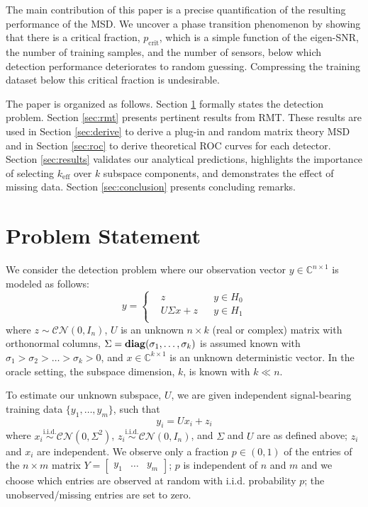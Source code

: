 The main contribution of this paper is a precise quantification of the resulting performance of the MSD. We uncover a phase transition phenomenon by showing that there is a critical fraction, $p_\text{crit}$, which is a simple function of the eigen-SNR, the number of training samples, and the number of sensors, below which detection performance deteriorates to random guessing. Compressing the training dataset below this critical fraction is undesirable.

The paper is organized as follows. Section \ref{sec:prob stat} formally states the detection problem. Section \ref{sec:rmt} presents pertinent results from RMT. These results are used in Section \ref{sec:derive} to derive a plug-in and random matrix theory MSD and in Section \ref{sec:roc} to derive theoretical ROC curves for each detector. Section \ref{sec:results} validates our analytical predictions, highlights the importance of selecting $k_\text{eff}$ over $k$ subspace components, and demonstrates the effect of missing data. Section \ref{sec:conclusion} presents concluding remarks.

\section{Problem Statement}\label{sec:prob stat}

We consider the detection problem where our observation vector $y \in \mathbb{C}^{n \times 1}$ is modeled as follows:
\begin{equation}\label{eq:problem}
y=\left\{
\begin{aligned}
&z
&& y\in H_0\\
&U\Sigma x+z
&& y\in H_1\\
\end{aligned}\right.
\end{equation}
where $z\sim\mathcal{CN}(0,I_n)$, $U$ is an unknown $n\times k$ (real or complex) matrix with orthonormal columns, $\Sigma=\mathop{\bf diag}(\sigma_1,\dots,\sigma_k)$ is assumed known with $\sigma_1>\sigma_2>\dots>\sigma_k>0$, and $x\in\mathbb{C}^{k\times 1}$ is an unknown deterministic vector. In the oracle setting, the subspace dimension, $k$, is known with $k\ll n$.

To estimate our unknown subspace, $U$, we are given independent signal-bearing training data $\{y_1,\dots,y_m\}$, such that
\begin{equation}\label{eq:training_data}
y_i = Ux_i + z_i
\end{equation}
where $x_i\overset{\text{i.i.d.}}{\sim}\mathcal{CN}(0,\Sigma^2)$, $z_i\overset{\text{i.i.d.}}{\sim}\mathcal{CN}(0,I_n)$, and $\Sigma$ and $U$ are as defined above; $z_i$ and $x_i$ are independent. We observe only a fraction $p \in (0,1)$ of the entries of the $n \times m$ matrix $Y = \begin{bmatrix} y_1 & \ldots & y_{m} \end{bmatrix}$; $p$ is independent of $n$ and $m$ and we choose which entries are observed at random with i.i.d. probability $p$; the unobserved/missing entries are set to zero.

